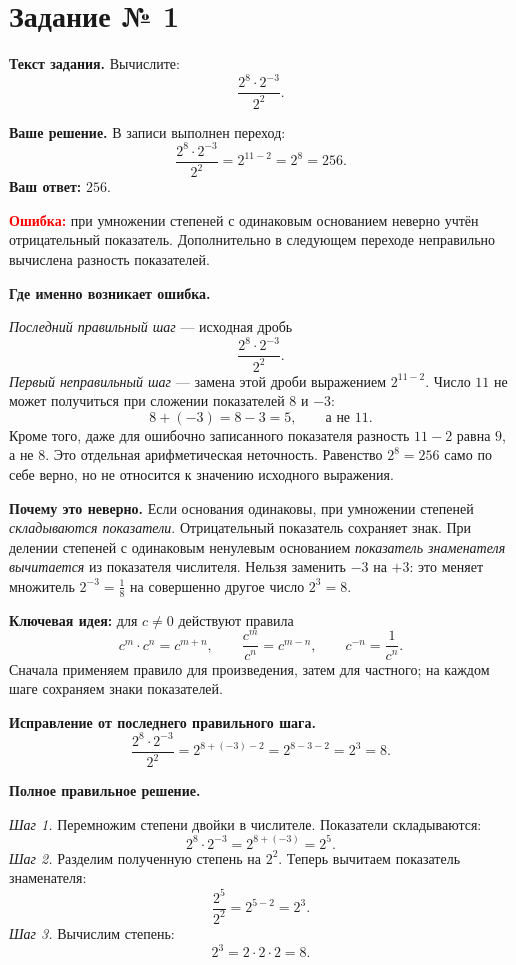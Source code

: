 \documentclass[12pt,a4paper]{article}
\begin{document}
\label{task:1}
\section*{Задание № 1}
\textbf{Текст задания.} Вычислите:
\[
\frac{2^8\cdot 2^{-3}}{2^2}.
\]

\textbf{Ваше решение.} В записи выполнен переход:
\[
\frac{2^8\cdot 2^{-3}}{2^2}
=2^{11-2}=2^8=256.
\]
\textbf{Ваш ответ:} $256$.

\textcolor{red}{\textbf{Ошибка:}} при умножении степеней с одинаковым основанием неверно учтён отрицательный показатель. Дополнительно в следующем переходе неправильно вычислена разность показателей.

\textbf{Где именно возникает ошибка.}

\emph{Последний правильный шаг} --- исходная дробь
\[
\frac{2^8\cdot 2^{-3}}{2^2}.
\]
\emph{Первый неправильный шаг} --- замена этой дроби выражением $2^{11-2}$. Число $11$ не может получиться при сложении показателей $8$ и $-3$:
\[
8+(-3)=8-3=5,\qquad \text{а не }11.
\]
Кроме того, даже для ошибочно записанного показателя разность $11-2$ равна $9$, а не $8$. Это отдельная арифметическая неточность. Равенство $2^8=256$ само по себе верно, но не относится к значению исходного выражения.

\textbf{Почему это неверно.} Если основания одинаковы, при умножении степеней \emph{складываются показатели}. Отрицательный показатель сохраняет знак. При делении степеней с одинаковым ненулевым основанием \emph{показатель знаменателя вычитается} из показателя числителя. Нельзя заменить $-3$ на $+3$: это меняет множитель $2^{-3}=\frac18$ на совершенно другое число $2^3=8$.

\textcolor{blue!60!black}{\textbf{Ключевая идея:}} для $c\ne0$ действуют правила
\[
c^m\cdot c^n=c^{m+n},\qquad
\frac{c^m}{c^n}=c^{m-n},\qquad
c^{-n}=\frac{1}{c^n}.
\]
Сначала применяем правило для произведения, затем для частного; на каждом шаге сохраняем знаки показателей.

\textbf{Исправление от последнего правильного шага.}
\[
\frac{2^8\cdot 2^{-3}}{2^2}
=2^{8+(-3)-2}
=2^{8-3-2}
=2^3=8.
\]

\textbf{Полное правильное решение.}

\emph{Шаг 1.} Перемножим степени двойки в числителе. Показатели складываются:
\[
2^8\cdot 2^{-3}=2^{8+(-3)}=2^5.
\]
\emph{Шаг 2.} Разделим полученную степень на $2^2$. Теперь вычитаем показатель знаменателя:
\[
\frac{2^5}{2^2}=2^{5-2}=2^3.
\]
\emph{Шаг 3.} Вычислим степень:
\[
2^3=2\cdot2\cdot2=8.
\]
\end{document}
